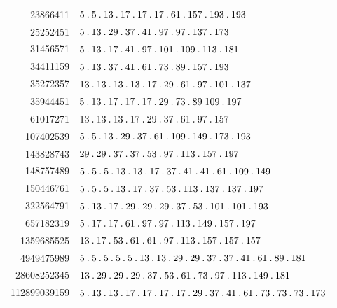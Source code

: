 %
\begingroup\small\setlength{\tabcolsep}{4pt}
\begin{longtable}{@{}r|l@{}}
23866411 & $5\pdot 5\pdot 13\pdot 17\pdot 17\pdot 17\pdot 61\pdot 157\pdot 193\pdot 193$\\
25252451 & $5\pdot 13\pdot 29\pdot 37\pdot 41\pdot 97\pdot 97\pdot 137\pdot 173$\\
31456571 & $5\pdot 13\pdot 17\pdot 41\pdot 97\pdot 101\pdot 109\pdot 113\pdot 181$\\
34411159 & $5\pdot 13\pdot 37\pdot 41\pdot 61\pdot 73\pdot 89\pdot 157\pdot 193$\\
35272357 & $13\pdot 13\pdot 13\pdot 13\pdot 17\pdot 29\pdot 61\pdot 97\pdot 101\pdot 137$\\
35944451 & $5\pdot 13\pdot 17\pdot 17\pdot 17\pdot 29\pdot 73\pdot 89\;109\pdot 197$\\
61017271 & $13\pdot 13\pdot 13\pdot 17\pdot 29\pdot 37\pdot 61\pdot 97\pdot 157$\\
107402539 & $5\pdot 5\pdot 13\pdot 29\pdot 37\pdot 61\pdot 109\pdot 149\pdot 173\pdot 193$\\
143828743 & $29\pdot 29\pdot 37\pdot 37\pdot 53\pdot 97\pdot 113\pdot 157\pdot 197$\\
148757489 & $5\pdot 5\pdot 5\pdot 13\pdot 13\pdot 17\pdot 37\pdot 41\pdot 41\pdot 61\pdot 109\pdot 149$\\
150446761 & $5\pdot 5\pdot 5\pdot 13\pdot 17\pdot 37\pdot 53\pdot 113\pdot 137\pdot 137\pdot 197$\\
322564791 & $5\pdot 13\pdot 17\pdot 29\pdot 29\pdot 29\pdot 37\pdot 53\pdot 101\pdot 101\pdot 193$\\
657182319 & $5\pdot 17\pdot 17\pdot 61\pdot 97\pdot 97\pdot 113\pdot 149\pdot 157\pdot 197$\\
1359685525 & $13\pdot 17\pdot 53\pdot 61\pdot 61\pdot 97\pdot 113\pdot 157\pdot 157\pdot 157$\\
4949475989 & $5\pdot 5\pdot 5\pdot 5\pdot 5\pdot 13\pdot 13\pdot 29\pdot 29\pdot 37\pdot 37\pdot 41\pdot 61\pdot 89\pdot 181$\\
28608252345 & $13\pdot 29\pdot 29\pdot 29\pdot 37\pdot 53\pdot 61\pdot 73\pdot 97\pdot 113\pdot 149\pdot 181$\\
112899039159 & $5\pdot 13\pdot 13\pdot 17\pdot 17\pdot 17\pdot 17\pdot 29\pdot 37\pdot 41\pdot 61\pdot 73\pdot 73\pdot 73\pdot 173$\\
\end{longtable}\endgroup
